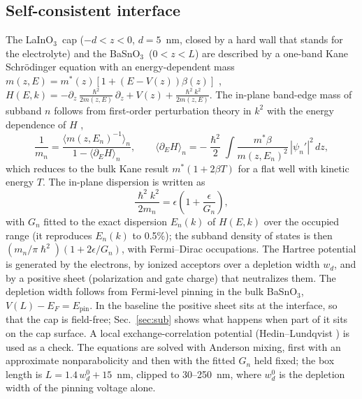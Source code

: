 \documentclass[11pt]{article}
\newcommand{\LIO}{LaInO$_3$}
\newcommand{\BSO}{BaSnO$_3$}
\begin{document}
\subsection{Self-consistent interface}
The \LIO\ cap ($-d<z<0$, $d=5$~nm, closed by a hard wall that stands for the electrolyte) and the \BSO\ ($0<z<L$) are described by a one-band Kane Schr\"odinger equation with an energy-dependent mass $m(z,E)=m^*(z)[1+(E-V(z))\beta(z)]$ \cite{Nelson1987}, $H(E,k)=-\partial_z\frac{\hslash^2}{2m(z,E)}\partial_z+V(z)+\frac{\hslash^2k^2}{2m(z,E)}$. The in-plane band-edge mass of subband $n$ follows from first-order perturbation theory in $k^2$ with the energy dependence of $H$ \cite{Ekenberg1989},
\begin{equation}
\frac{1}{m_n}=\frac{\langle m(z,E_n)^{-1}\rangle_n}{1-\langle\partial_EH\rangle_n},\qquad \langle\partial_EH\rangle_n=-\frac{\hslash^2}{2}\int\frac{m^*\beta}{m(z,E_n)^2}\,|\psi_n'|^2\,dz,\label{eq:mass}
\end{equation}
which reduces to the bulk Kane result $m^*(1+2\beta T)$ for a flat well with kinetic energy $T$. The in-plane dispersion is written as
\begin{equation}
\frac{\hslash^2k^2}{2m_n}=\epsilon\left(1+\frac{\epsilon}{G_n}\right),\label{eq:disp}
\end{equation}
with $G_n$ fitted to the exact dispersion $E_n(k)$ of $H(E,k)$ over the occupied range (it reproduces $E_n(k)$ to 0.5\%); the subband density of states is then $(m_n/\pi\hslash^2)(1+2\epsilon/G_n)$, with Fermi--Dirac occupations. The Hartree potential is generated by the electrons, by ionized acceptors over a depletion width $w_d$, and by a positive sheet (polarization and gate charge) that neutralizes them. The depletion width follows from Fermi-level pinning in the bulk \BSO, $V(L)-E_F=E_\mathrm{pin}$. In the baseline the positive sheet sits at the interface, so that the cap is field-free; Sec.~\ref{sec:sub} shows what happens when part of it sits on the cap surface. A local exchange-correlation potential (Hedin--Lundqvist \cite{HedinLundqvist1971}) is used as a check. The equations are solved with Anderson mixing, first with an approximate nonparabolicity and then with the fitted $G_n$ held fixed; the box length is $L=1.4\,w_d^{0}+15$~nm, clipped to 30--250~nm, where $w_d^0$ is the depletion width of the pinning voltage alone.
\end{document}
